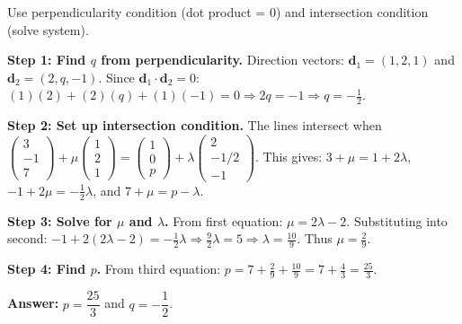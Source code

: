 \begin{hint}
Use perpendicularity condition (dot product = 0) and intersection condition (solve system).
\end{hint}

\begin{solution}[Sketch]
\textbf{Step 1: Find $q$ from perpendicularity.} Direction vectors: $\mathbf{d}_1 = (1, 2, 1)$ and $\mathbf{d}_2 = (2, q, -1)$. Since $\mathbf{d}_1 \cdot \mathbf{d}_2 = 0$: $(1)(2) + (2)(q) + (1)(-1) = 0 \Rightarrow 2q = -1 \Rightarrow q = -\frac{1}{2}$.

\textbf{Step 2: Set up intersection condition.} The lines intersect when $\begin{pmatrix} 3 \\ -1 \\ 7 \end{pmatrix} + \mu \begin{pmatrix} 1 \\ 2 \\ 1 \end{pmatrix} = \begin{pmatrix} 1 \\ 0 \\ p \end{pmatrix} + \lambda \begin{pmatrix} 2 \\ -1/2 \\ -1 \end{pmatrix}$. This gives: $3 + \mu = 1 + 2\lambda$, $-1 + 2\mu = -\frac{1}{2}\lambda$, and $7 + \mu = p - \lambda$.

\textbf{Step 3: Solve for $\mu$ and $\lambda$.} From first equation: $\mu = 2\lambda - 2$. Substituting into second: $-1 + 2(2\lambda - 2) = -\frac{1}{2}\lambda \Rightarrow \frac{9}{2}\lambda = 5 \Rightarrow \lambda = \frac{10}{9}$. Thus $\mu = \frac{2}{9}$.

\textbf{Step 4: Find $p$.} From third equation: $p = 7 + \frac{2}{9} + \frac{10}{9} = 7 + \frac{4}{3} = \frac{25}{3}$.

\textbf{Answer:} $p = \dfrac{25}{3}$ and $q = -\dfrac{1}{2}$.
\end{solution}

\vspace{1em}

